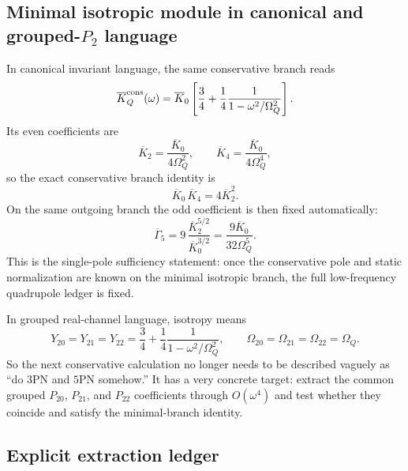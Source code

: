 \documentclass[11pt]{article}
\begin{document}
\subsection{Minimal isotropic module in canonical and grouped-\texorpdfstring{$P_2$}{P\_2} language}
\label{app:qnorm-grouped-target}

In canonical invariant language, the same conservative branch reads
\[
\overline K_Q^{\rm cons}(\omega)
=
\overline K_0\left[
\frac34+\frac14\frac{1}{1-\omega^2/\Omega_Q^2}
\right].
\]
Its even coefficients are
\[
\overline K_2=\frac{\overline K_0}{4\Omega_Q^2},
\qquad
\overline K_4=\frac{\overline K_0}{4\Omega_Q^4},
\]
so the exact conservative branch identity is
\begin{equation}
\boxed{
\overline K_0\,\overline K_4=4\overline K_2^2.
}
\label{eq:qnorm-single-pole-branch-identity}
\end{equation}
On the same outgoing branch the odd coefficient is then fixed automatically:
\[
\overline\Gamma_5
=
9\,\frac{\overline K_2^{5/2}}{\overline K_0^{3/2}}
=
\frac{9\overline K_0}{32\Omega_Q^5}.
\]
This is the single-pole sufficiency statement: once the conservative pole and
static normalization are known on the minimal isotropic branch, the full
low-frequency quadrupole ledger is fixed.

In grouped real-channel language, isotropy means
\[
Y_{20}=Y_{21}=Y_{22}
=
\frac34+\frac14\frac{1}{1-\omega^2/\Omega_Q^2},
\qquad
\Omega_{20}=\Omega_{21}=\Omega_{22}=\Omega_Q.
\]
So the next conservative calculation no longer needs to be described vaguely as
``do $3$PN and $5$PN somehow.''  It has a very concrete target: extract the
common grouped $P_{20}$, $P_{21}$, and $P_{22}$ coefficients through
$O(\omega^4)$ and test whether they coincide and satisfy the minimal-branch
identity.

\subsection{Explicit extraction ledger}
\label{app:qnorm-extraction-ledger}
\end{document}
